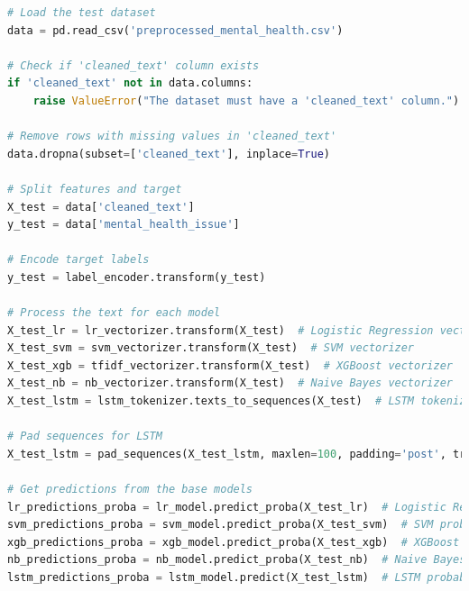 \begin{tcolorbox}[colback=gray!5!white, colframe=gray!80!black, boxrule=0.5pt, title=Evaluate Meta-Learner and Ensemble Model]
    \begin{lstlisting}[language=Python]
# Load the test dataset
data = pd.read_csv('preprocessed_mental_health.csv')

# Check if 'cleaned_text' column exists
if 'cleaned_text' not in data.columns:
    raise ValueError("The dataset must have a 'cleaned_text' column.")

# Remove rows with missing values in 'cleaned_text'
data.dropna(subset=['cleaned_text'], inplace=True)

# Split features and target
X_test = data['cleaned_text']
y_test = data['mental_health_issue']

# Encode target labels
y_test = label_encoder.transform(y_test)

# Process the text for each model
X_test_lr = lr_vectorizer.transform(X_test)  # Logistic Regression vectorizer
X_test_svm = svm_vectorizer.transform(X_test)  # SVM vectorizer
X_test_xgb = tfidf_vectorizer.transform(X_test)  # XGBoost vectorizer
X_test_nb = nb_vectorizer.transform(X_test)  # Naive Bayes vectorizer
X_test_lstm = lstm_tokenizer.texts_to_sequences(X_test)  # LSTM tokenizer

# Pad sequences for LSTM
X_test_lstm = pad_sequences(X_test_lstm, maxlen=100, padding='post', truncating='post')

# Get predictions from the base models
lr_predictions_proba = lr_model.predict_proba(X_test_lr)  # Logistic Regression probabilities
svm_predictions_proba = svm_model.predict_proba(X_test_svm)  # SVM probabilities
xgb_predictions_proba = xgb_model.predict_proba(X_test_xgb)  # XGBoost probabilities
nb_predictions_proba = nb_model.predict_proba(X_test_nb)  # Naive Bayes probabilities
lstm_predictions_proba = lstm_model.predict(X_test_lstm)  # LSTM probabilities
\end{lstlisting}
\end{tcolorbox}

